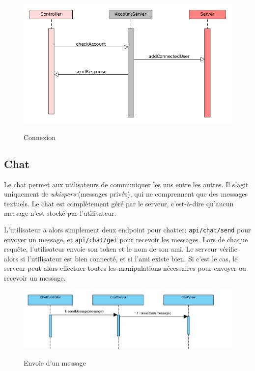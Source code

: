 \documentclass[../design_fonctionnement_sys.tex]{subfiles}
\begin{document}
\begin{figure}[H]
    \centering
    \includegraphics[scale=0.4]{img_design/connexion_seq.png}
    \label{fig:seq_match_client}
    \caption{Connexion}
\end{figure}


\subsection{Chat}
Le chat permet aux utilisateurs de communiquer les uns entre les autres. Il s'agit uniquement de \textit{whispers} (messages privés), qui ne comprennent que des messages textuels.
Le chat est complètement géré par le serveur, c'est-à-dire qu'aucun message n'est stocké par l'utilisateur.

L'utilisateur a alors simplement deux endpoint pour chatter: \texttt{api/chat/send} pour envoyer un message, et \texttt{api/chat/get} pour recevoir les messages.
Lors de chaque requête, l'utilisateur envoie son token et le nom de son ami. Le serveur vérifie alors si l'utilisateur est bien connecté, et si l'ami existe bien.
Si c'est le cas, le serveur peut alors effectuer toutes les manipulations nécessaires pour envoyer ou recevoir un message.

\begin{figure}[H]
    \centering
    \includegraphics[scale=0.3]{img_design/Chat_DS.png}
    \label{fig:seq_match_client}
    \caption{Envoie d'un message}
\end{figure}
\end{document}
